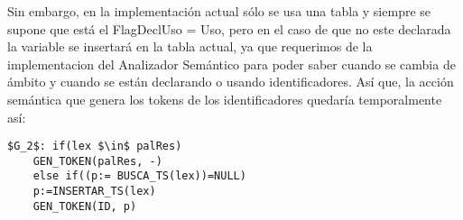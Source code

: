 Sin embargo, en la implementación actual sólo se usa una tabla y siempre se supone que está el FlagDeclUso = Uso, pero en el caso de que no este declarada la variable se insertará en la tabla actual, ya que requerimos de la implementacion del Analizador Semántico para poder saber cuando se cambia de ámbito y cuando se están declarando o usando identificadores. Así que, la acción semántica que genera los tokens de los identificadores quedaría temporalmente así:
\begin{lstlisting}
$G_2$: if(lex $\in$ palRes)
	GEN_TOKEN(palRes, -)
    else if((p:= BUSCA_TS(lex))=NULL)
	p:=INSERTAR_TS(lex)
	GEN_TOKEN(ID, p)
\end{lstlisting}


